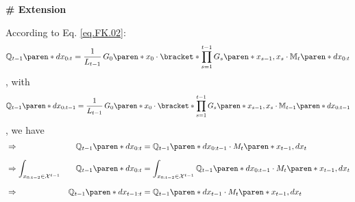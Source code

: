 \textbf{\# Extension}

According to Eq. \eqref{eq.FK.02}:
%
\begin{equation*}
    \mathbb{Q}_{t-1} \paren*{dx_{0:t}} =
        \dfrac{1}{L_{t-1}} \,
        G_{0} \paren*{x_{0}} \cdot \bracket*{
            \prod_{s = 1}^{{t-1}} G_{s} \paren*{x_{s - 1}, x_{s}}
        }
        \cdot \mathbb{M}_{t} \paren*{dx_{0:t}}
\end{equation*}
%
, with
%
\begin{equation*}
    \mathbb{Q}_{t-1} \paren*{dx_{0:t-1}} =
        \dfrac{1}{L_{t-1}} \,
        G_{0} \paren*{x_{0}} \cdot \bracket*{
            \prod_{s = 1}^{{t-1}} G_{s} \paren*{x_{s - 1}, x_{s}}
        }
        \cdot \mathbb{M}_{t-1} \paren*{dx_{0:t-1}}
\end{equation*}
%
, we have
%
\begin{alignat}{3}
    & \Rightarrow &
    \mathbb{Q}_{t-1} \paren*{dx_{0:t}} &=
        \mathbb{Q}_{t-1} \paren*{dx_{0:t-1}}
        \cdot M_{t} \paren*{x_{t-1}, dx_{t}}
    \nonumber \\[1.5ex] & \Rightarrow
    \int_{x_{0:t-2} \in \mathcal{X}^{t-1}} &
        \mathbb{Q}_{t-1} \paren*{dx_{0:t}} &=
        \int _{x_{0:t-2} \in \mathcal{X}^{t-1}}
        \mathbb{Q}_{t-1} \paren*{dx_{0:t-1}}
        \cdot M_{t} \paren*{x_{t-1}, dx_{t}}
    \nonumber \\[1.5ex] & \Rightarrow &
        \mathbb{Q}_{t-1} \paren*{dx_{t-1:t}} &=
            \mathbb{Q}_{t-1} \paren*{dx_{t-1}}
            \cdot M_{t} \paren*{x_{t-1}, dx_{t}}
    \label{appendix.eq.forward-recursion.extension}
\end{alignat}